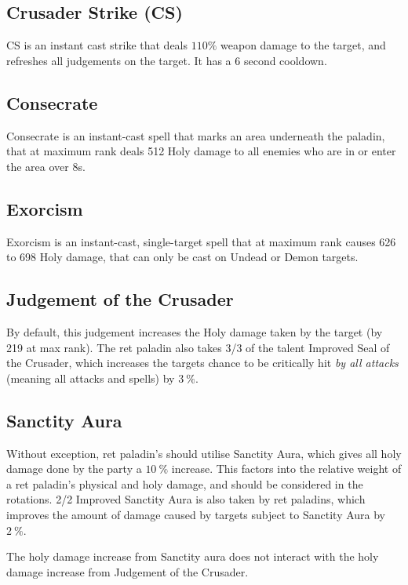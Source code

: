\documentclass[letterpaper,11pt]{article}
\begin{document}
	\subsection{Crusader Strike (CS)}
	CS is an instant cast strike that deals $110 \%$ weapon damage to the target, and refreshes all judgements on the target.
	It has a 6 second cooldown.
	
	
	\subsection{Consecrate}
	Consecrate is an instant-cast spell that marks an area underneath the paladin, that at maximum rank deals 512 Holy damage to all enemies who are in or enter the area over 8s.

	
	\subsection{Exorcism}
	Exorcism is an instant-cast, single-target spell that at maximum rank causes 626 to 698 Holy damage, that can only be cast on Undead or Demon targets.
	
	
	\subsection{Judgement of the Crusader}
	By default, this judgement increases the Holy damage taken by the target (by 219 at max rank).
	The ret paladin also takes 3/3 of the talent Improved Seal of the Crusader, which increases the targets chance to be critically hit \emph{by all attacks} (meaning all attacks and spells) by $3~\%$.	
	
	\subsection{Sanctity Aura}
	Without exception, ret paladin's should utilise Sanctity Aura, which gives all holy damage done by the party a $10~\%$ increase.
	This factors into the relative weight of a ret paladin's physical and holy damage, and should be considered in the rotations.
	2/2 Improved Sanctity Aura is also taken by ret paladins, which improves the amount of damage caused by targets subject to Sanctity Aura by $2~\%$.
	
	The holy damage increase from Sanctity aura does not interact with the holy damage increase from Judgement of the Crusader.
	

	

	\appendix
	
\end{document}
